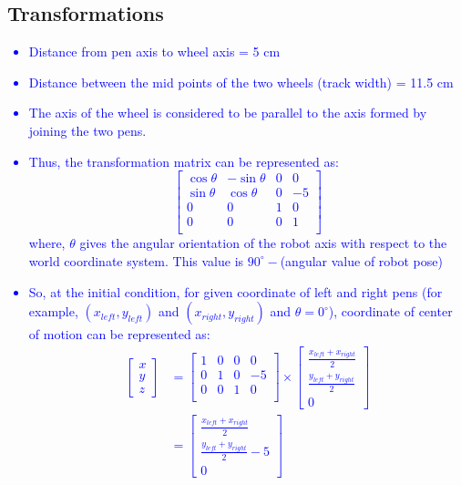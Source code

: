 \documentclass[10pt,a4paper]{article}
\begin{document}
			\subsection{Transformations}\textcolor{blue}{
				\begin{itemize}
					\item Distance from pen axis to wheel axis = 5 cm
					\item Distance between the mid points of the two wheels (track width) = 11.5 cm
					\item The axis of the wheel is considered to be parallel to the axis formed by joining the two pens.
					\item Thus, the transformation matrix can be represented as:
					$$
					\begin{bmatrix}
						\cos\theta & -\sin\theta & 0 & 0 \\
						\sin\theta &\cos\theta & 0 & -5 \\
						0 & 0 & 1 & 0 \\
						0 & 0 & 0 & 1 \\
					\end{bmatrix}					
					$$
					where, $\theta$ gives the angular orientation of the robot axis with respect to the world coordinate system. This value is $90^\circ-$(angular value of robot pose) 
					\item So, at the initial condition, for given coordinate of left and right pens (for example, $(x_{left},y_{left})$ and $(x_{right},y_{right})$ and $\theta = 0^\circ$), coordinate of center of motion can be represented as:
					\begin{align*}
					\begin{bmatrix}
					x\\y\\z
					\end{bmatrix} &=
									\begin{bmatrix}
									1 & 0 & 0 & 0 \\
									0 & 1 & 0 & -5 \\
									0 & 0 & 1 & 0 \\
									\end{bmatrix} 
										\times
									\begin{bmatrix}
									\frac{x_{left}+x_{right}}{2}\\\frac{y_{left}+y_{right}}{2}\\0
									\end{bmatrix}\\\
								&=\begin{bmatrix}
								\frac{x_{left}+x_{right}}{2}\\\frac{y_{left}+y_{right}}{2}-5\\0
								\end{bmatrix}											
					\end{align*}
				\end{itemize}
			}
\end{document}
